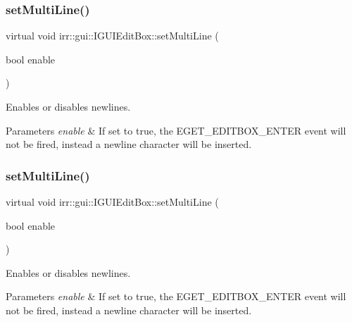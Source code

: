 \subsubsection{\texorpdfstring{set\+Multi\+Line()}{setMultiLine()}\hspace{0.1cm}{\footnotesize\ttfamily [1/2]}}
{\footnotesize\ttfamily virtual void irr\+::gui\+::\+I\+G\+U\+I\+Edit\+Box\+::set\+Multi\+Line (\begin{DoxyParamCaption}\item[{bool}]{enable }\end{DoxyParamCaption})\hspace{0.3cm}{\ttfamily [pure virtual]}}



Enables or disables newlines. 


\begin{DoxyParams}{Parameters}
{\em enable} & If set to true, the E\+G\+E\+T\+\_\+\+E\+D\+I\+T\+B\+O\+X\+\_\+\+E\+N\+T\+ER event will not be fired, instead a newline character will be inserted. \\
\hline
\end{DoxyParams}
\mbox{\label{classirr_1_1gui_1_1IGUIEditBox_a0f68dc7ddc74d8103ba3ba4d445dbf9a}} 
\subsubsection{\texorpdfstring{set\+Multi\+Line()}{setMultiLine()}\hspace{0.1cm}{\footnotesize\ttfamily [2/2]}}
{\footnotesize\ttfamily virtual void irr\+::gui\+::\+I\+G\+U\+I\+Edit\+Box\+::set\+Multi\+Line (\begin{DoxyParamCaption}\item[{bool}]{enable }\end{DoxyParamCaption})\hspace{0.3cm}{\ttfamily [pure virtual]}}



Enables or disables newlines. 


\begin{DoxyParams}{Parameters}
{\em enable} & If set to true, the E\+G\+E\+T\+\_\+\+E\+D\+I\+T\+B\+O\+X\+\_\+\+E\+N\+T\+ER event will not be fired, instead a newline character will be inserted. \\
\hline
\end{DoxyParams}
\mbox{\label{classirr_1_1gui_1_1IGUIEditBox_aa134d2a36c52abcb4881da0267031c47}} 

